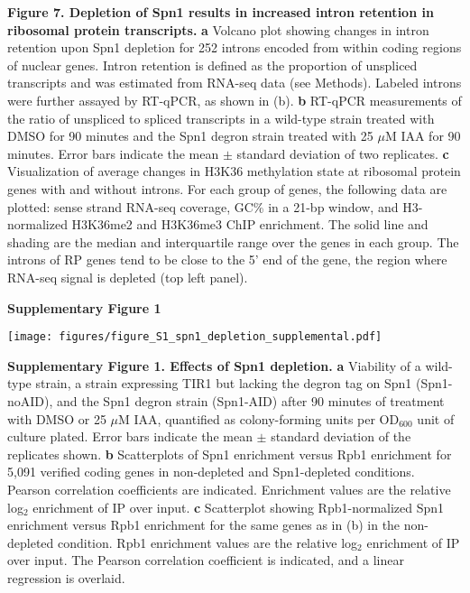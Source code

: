 \documentclass[8pt]{extarticle}
\begin{document}
\vspace{2em}
\textbf{Figure 7. Depletion of Spn1 results in increased intron retention in ribosomal protein transcripts.}
\textbf{a} Volcano plot showing changes in intron retention upon Spn1 depletion for 252 introns encoded from within coding regions of nuclear genes.
Intron retention is defined as the proportion of unspliced transcripts and was estimated from RNA-seq data (see Methods).
Labeled introns were further assayed by RT-qPCR, as shown in (b).
\textbf{b} RT-qPCR measurements of the ratio of unspliced to spliced transcripts in a wild-type strain treated with DMSO for 90 minutes and the Spn1 degron strain treated with 25 $\mu$M IAA for 90 minutes.
Error bars indicate the mean $\pm$ standard deviation of two replicates.
\textbf{c} Visualization of average changes in H3K36 methylation state at ribosomal protein genes with and without introns.
For each group of genes, the following data are plotted: sense strand RNA-seq coverage, GC\% in a 21-bp window, and H3-normalized H3K36me2 and H3K36me3 ChIP enrichment.
The solid line and shading are the median and interquartile range over the genes in each group.
The introns of RP genes tend to be close to the 5’ end of the gene, the region where RNA-seq signal is depleted (top left panel).

\newpage

\textbf{\large Supplementary Figure 1}

{\texttt{[image: figures/figure\_S1\_spn1\_depletion\_supplemental.pdf]}\par}

\vspace{2em}
\textbf{Supplementary Figure 1. Effects of Spn1 depletion.}
\textbf{a} Viability of a wild-type strain, a strain expressing TIR1 but lacking the degron tag on Spn1 (Spn1-noAID), and the Spn1 degron strain (Spn1-AID) after 90 minutes of treatment with DMSO or 25 $\mu$M IAA, quantified as colony-forming units per OD$_{600}$ unit of culture plated.
Error bars indicate the mean $\pm$ standard deviation of the replicates shown.
\textbf{b} Scatterplots of Spn1 enrichment versus Rpb1 enrichment for 5,091 verified coding genes in non-depleted and Spn1-depleted conditions.
Pearson correlation coefficients are indicated.
Enrichment values are the relative log$_2$ enrichment of IP over input.
\textbf{c} Scatterplot showing Rpb1-normalized Spn1 enrichment versus Rpb1 enrichment for the same genes as in (b) in the non-depleted condition.
Rpb1 enrichment values are the relative log$_2$ enrichment of IP over input.
The Pearson correlation coefficient is indicated, and a linear regression is overlaid.
\end{document}
